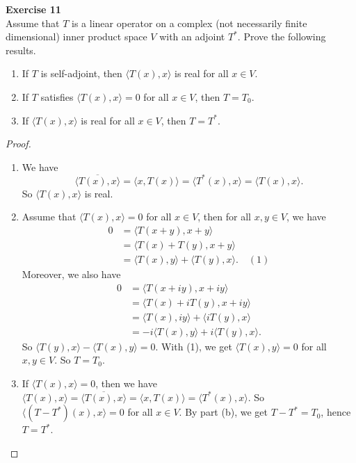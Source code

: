 \documentclass[12pt, a4paper]{article}
\theoremstyle{plain}
\newenvironment{exercise}[2][Exercise]
    { \begin{mdframed}[backgroundcolor=gray!20] \textbf{#1 #2} \\}
    {  \end{mdframed}}
\begin{document}
	
\begin{exercise}{11}
Assume that $T$ is a linear operator on a complex (not necessarily finite dimensional) inner product space $V$ with an adjoint $T^*$. Prove the following results.
\begin{enumerate}[label=(\alph*)]
\item If $T$ is self-adjoint, then $\langle{T(x),x}\rangle$ is real for all $x\in V$.
\item If $T$ satisfies $\langle{T(x),x}\rangle =0$ for all $x\in V$, then $T=T_0$.
\item If $\langle{T(x),x}\rangle$ is real for all $x\in V$, then $T=T^*$.
\end{enumerate}
\end{exercise}
	\begin{proof}
	\hfill
	\begin{enumerate}[label=(\alph*)]
	\item We have 
	\[
	\overline{\langle{T(x),x}\rangle}=\langle{x,T(x)}\rangle=\langle{T^*(x),x}\rangle = \langle{T(x),x}\rangle.
	\]
	So $\langle{T(x),x}\rangle$ is real.
	\item Assume that $\langle{T(x),x}\rangle =0$ for all $x\in V$, then for all $x,y\in V$, we have
	\begin{align*}
	0 &= \langle{T(x+y),x+y}\rangle\\
	&= \langle{T(x)+T(y),x+y}\rangle\\
	&=\langle{T(x),y}\rangle+\langle{T(y),x}\rangle. \quad (1)
	\end{align*}	
	Moreover, we also have 
	\begin{align*}
	0 &= \langle{T(x+iy),x+iy}\rangle\\
	&= \langle{T(x)+iT(y),x+iy}\rangle \\
	&= \langle{T(x),iy}\rangle+\langle{iT(y),x}\rangle \\
	&= -i\langle{T(x),y}\rangle + i\langle{T(y),x}\rangle.
	\end{align*}	
	So $\langle{T(y),x }\rangle - \langle{T(x),y}\rangle =0$. With (1), we get $\langle{T(x),y}\rangle =0$ for all $x,y\in V$. So $T=T_0$.
	
	\item If $\langle{T(x),x}\rangle=0$, then we have $\langle{T(x),x}\rangle=\overline{\langle{T(x),x}\rangle}=\langle{x,T(x)}\rangle =\langle{T^*(x),x}\rangle$. So $\langle{(T-T^*)(x),x}\rangle = 0$ for all $x\in V$. By part (b), we get $T-T^*=T_0$, hence $T=T^*$.
	\end{enumerate}
	\end{proof}
	
\end{document}
